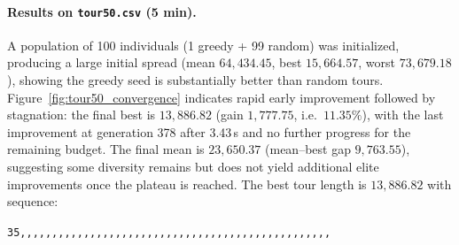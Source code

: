 \documentclass[a4paper,10pt]{article}
\begin{document}




\paragraph{Results on \texttt{tour50.csv} (5 min).}
A population of 100 individuals (1 greedy + 99 random) was initialized, producing a large initial spread (mean $64{,}434.45$, best $15{,}664.57$, worst $73{,}679.18$), showing the greedy seed is substantially better than random tours.
Figure~\ref{fig:tour50_convergence} indicates rapid early improvement followed by stagnation: the final best is $13{,}886.82$ (gain $1{,}777.75$, i.e.\ $11.35\%$), with the last improvement at generation 378 after 3.43\,s and no further progress for the remaining budget.
The final mean is $23{,}650.37$ (mean--best gap $9{,}763.55$), suggesting some diversity remains but does not yield additional elite improvements once the plateau is reached.
The best tour length is $13{,}886.82$ with sequence:



\texttt{35,,,,,,,,,,,,,,,,,,,,,,,,,,,,,,,,,,,,,,,,,,,,,,,,,}
\end{document}
